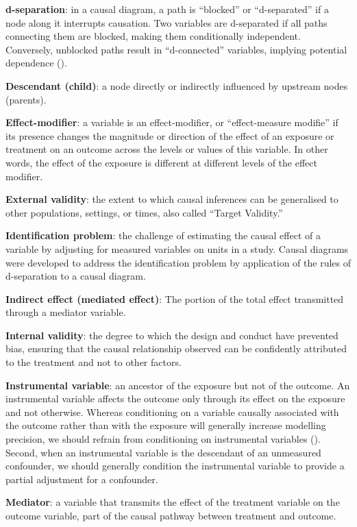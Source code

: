 \documentclass[
  singlecolumn]{article}
\begin{document}
\textbf{d-separation}: in a causal diagram, a path is ``blocked'' or
``d-separated'' if a node along it interrupts causation. Two variables
are d-separated if all paths connecting them are blocked, making them
conditionally independent. Conversely, unblocked paths result in
``d-connected'' variables, implying potential dependence
().

\textbf{Descendant (child)}: a node directly or indirectly influenced by
upstream nodes (parents).

\textbf{Effect-modifier}: a variable is an effect-modifier, or
``effect-measure modifie'' if its presence changes the magnitude or
direction of the effect of an exposure or treatment on an outcome across
the levels or values of this variable. In other words, the effect of the
exposure is different at different levels of the effect modifier.

\textbf{External validity}: the extent to which causal inferences can be
generalised to other populations, settings, or times, also called
``Target Validity.''

\textbf{Identification problem}: the challenge of estimating the causal
effect of a variable by adjusting for measured variables on units in a
study. Causal diagrams were developed to address the identification
problem by application of the rules of d-separation to a causal diagram.

\textbf{Indirect effect (mediated effect)}: The portion of the total
effect transmitted through a mediator variable.

\textbf{Internal validity}: the degree to which the design and conduct
have prevented bias, ensuring that the causal relationship observed can
be confidently attributed to the treatment and not to other factors.

\textbf{Instrumental variable}: an ancestor of the exposure but not of
the outcome. An instrumental variable affects the outcome only through
its effect on the exposure and not otherwise. Whereas conditioning on a
variable causally associated with the outcome rather than with the
exposure will generally increase modelling precision, we should refrain
from conditioning on instrumental variables
(). Second, when
an instrumental variable is the descendant of an unmeasured confounder,
we should generally condition the instrumental variable to provide a
partial adjustment for a confounder.

\textbf{Mediator}: a variable that transmits the effect of the treatment
variable on the outcome variable, part of the causal pathway between
treatment and outcome.
\end{document}
